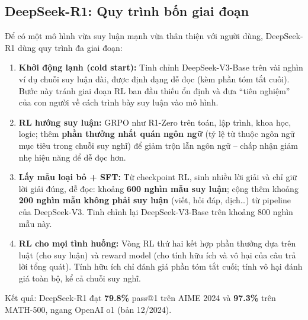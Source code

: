 \subsection{DeepSeek-R1: Quy trình bốn giai đoạn}
\label{ssec:r1_pipeline}
Để có một mô hình vừa suy luận mạnh vừa thân thiện với người dùng, DeepSeek-R1 dùng quy trình đa giai đoạn:
\begin{enumerate}
	\item \textbf{Khởi động lạnh (cold start):} Tinh chỉnh DeepSeek-V3-Base trên vài nghìn ví dụ chuỗi suy luận dài, được định dạng dễ đọc (kèm phần tóm tắt cuối). Bước này tránh giai đoạn RL ban đầu thiếu ổn định và đưa “tiên nghiệm” của con người về cách trình bày suy luận vào mô hình.
	\item \textbf{RL hướng suy luận:} GRPO như R1-Zero trên toán, lập trình, khoa học, logic; thêm \textbf{phần thưởng nhất quán ngôn ngữ} (tỷ lệ từ thuộc ngôn ngữ mục tiêu trong chuỗi suy nghĩ) để giảm trộn lẫn ngôn ngữ -- chấp nhận giảm nhẹ hiệu năng để dễ đọc hơn.
	\item \textbf{Lấy mẫu loại bỏ + SFT:} Từ checkpoint RL, sinh nhiều lời giải và chỉ giữ lời giải đúng, dễ đọc: khoảng \textbf{600 nghìn mẫu suy luận}; cộng thêm khoảng \textbf{200 nghìn mẫu không phải suy luận} (viết, hỏi đáp, dịch\ldots) từ pipeline của DeepSeek-V3. Tinh chỉnh lại DeepSeek-V3-Base trên khoảng 800 nghìn mẫu này.
	\item \textbf{RL cho mọi tình huống:} Vòng RL thứ hai kết hợp phần thưởng dựa trên luật (cho suy luận) và reward model (cho tính hữu ích và vô hại của câu trả lời tổng quát). Tính hữu ích chỉ đánh giá phần tóm tắt cuối; tính vô hại đánh giá toàn bộ, kể cả chuỗi suy nghĩ.
\end{enumerate}
Kết quả: DeepSeek-R1 đạt \textbf{79.8\%} pass@1 trên AIME 2024 và \textbf{97.3\%} trên MATH-500, ngang OpenAI o1 (bản 12/2024).

\begin{center}
\label{fig:r1_pipeline}
\end{center}

